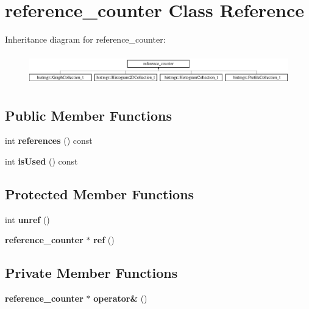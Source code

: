 \section{reference\-\_\-counter Class Reference}
\label{classreference__counter}
Inheritance diagram for reference\-\_\-counter\-:\begin{figure}[H]
\begin{center}
\leavevmode
\includegraphics[height=1.372549cm]{classreference__counter}
\end{center}
\end{figure}
\subsection*{Public Member Functions}
\begin{DoxyCompactItemize}
\item 
int {\bfseries references} () const \label{classreference__counter_ac1da688951ae1a15d2b38fba6be3578e}

\item 
int {\bfseries is\-Used} () const \label{classreference__counter_a150263255106bfe81c6ef086098b16bd}

\end{DoxyCompactItemize}
\subsection*{Protected Member Functions}
\begin{DoxyCompactItemize}
\item 
int {\bfseries unref} ()\label{classreference__counter_a2d715904d0723dc6daef682c98793667}

\item 
{\bf reference\-\_\-counter} $\ast$ {\bfseries ref} ()\label{classreference__counter_a74ffff2ab271730a149d5337db9b347d}

\end{DoxyCompactItemize}
\subsection*{Private Member Functions}
\begin{DoxyCompactItemize}
\item 
{\bf reference\-\_\-counter} $\ast$ {\bfseries operator\&} ()\label{classreference__counter_a8f6c78124ca5d3d6d7fd2cef42c5ad1f}

\end{DoxyCompactItemize}
